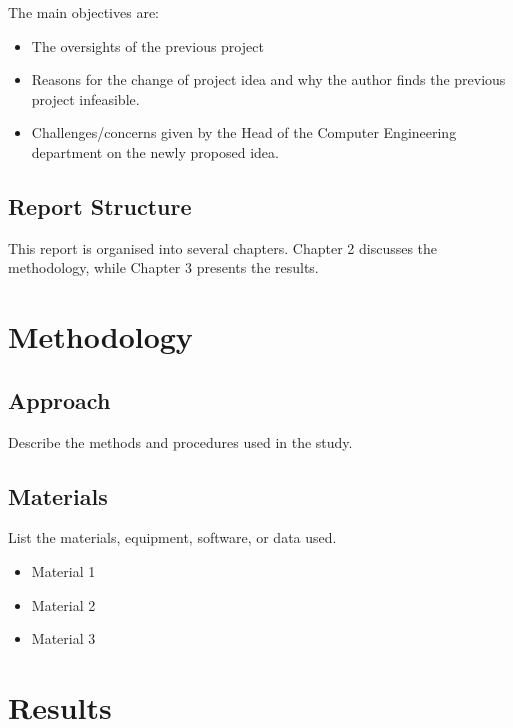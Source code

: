 \documentclass[12pt,a4paper]{report}
\begin{document}
The main objectives are:

\begin{itemize}
    \item The oversights of the previous project
    \item Reasons for the change of project idea and why the author finds the previous project infeasible.
    \item Challenges/concerns given by the Head of the Computer Engineering department on the newly proposed idea.
\end{itemize}

\section{Report Structure}

This report is organised into several chapters. 
Chapter 2 discusses the methodology, while Chapter 3 presents
the results.

\chapter{Methodology}

\section{Approach}

Describe the methods and procedures used in the study.

\section{Materials}

List the materials, equipment, software, or data used.

\begin{itemize}
    \item Material 1
    \item Material 2
    \item Material 3
\end{itemize}

\chapter{Results}
\end{document}
